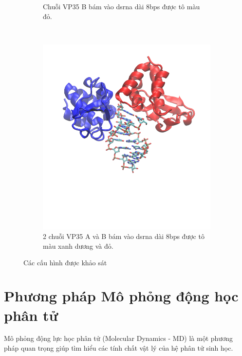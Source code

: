 \documentclass[12pt,a4paper,reqno, oneside]{book}
\begin{document}
\begin{figure}[p]
\begin{subfigure}[h]{0.5\textwidth}
		\vspace{-40pt}
		\caption{Chuỗi VP35 B bám vào \gls{dsrna} dài 8bps được tô màu đỏ.}
		\label{fig:vp35b}
		\end{subfigure}
		\\
		\begin{subfigure}[h]{0.9\textwidth}
		\centering
		\includegraphics[width=1.0\linewidth,natwidth=610,natheight=642]{VP35_AB.png}
		\vspace{-160pt}
		\caption{2 chuỗi VP35 A và B bám vào \gls{dsrna} dài 8bps được tô màu xanh dương và đỏ.}
		\label{fig:vp35ab}
		\end{subfigure}
		\clearpage

		\caption{Các cấu hình được khảo sát}
		\end{figure}
\newpage
\section{Phương pháp Mô phỏng động học phân tử}
Mô phỏng động lực học phân tử (Molecular Dynamics - MD) là một phương pháp quan trọng giúp tìm hiểu các tính chất vật lý của hệ phân tử sinh học.
\end{document}
